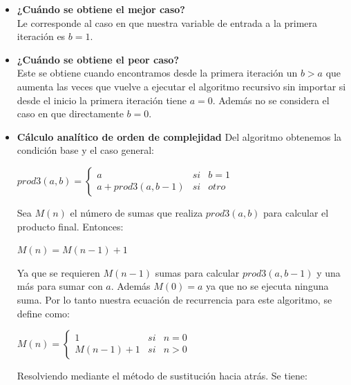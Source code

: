 \documentclass{report}
\begin{document}
            \begin{itemize}
                \item\textbf{¿Cu\'ando se obtiene el mejor caso?}\\
                Le corresponde al caso en que nuestra variable de entrada a la primera iteraci\'on es $b=1$.
                \item\textbf{¿Cu\'ando se obtiene el peor caso?}\\
                Este se obtiene cuando encontramos desde la primera iteraci\'on un $b>a$ que aumenta las veces que vuelve a ejecutar el algoritmo recursivo sin importar si desde el inicio la primera iteraci\'on tiene  $a=0$. Adem\'as no se considera el caso en que directamente $b=0$.
                \item\textbf{C\'alculo anal\'itico de orden de complejidad}
                Del algoritmo obtenemos la condición base y el caso general:
                \begin{center}
                    $prod3(a,b) = 
                    \left\{
                        \begin{array}{lcc}
                            a & si & b=1\\
                            a+prod3(a,b-1) & si & otro
                        \end{array}
                    \right.$
                \end{center}
                Sea $M(n)$ el n\'umero de sumas que realiza $prod3(a,b)$ para calcular el producto final. Entonces:
                \begin{center}
                    $M(n)=M(n-1)+1$
                \end{center}
                Ya que se requieren $M(n-1)$ sumas para calcular $prod3(a,b-1)$ y una más para sumar con $a$. Adem\'as $M(0)=a$ ya que no se ejecuta ninguna suma. Por lo tanto nuestra ecuaci\'on de recurrencia para este algoritmo, se define como:
                \begin{center}
                    $M(n) = 
                    \left\{
                        \begin{array}{lcc}
                            1 & si & n=0\\
                            M(n-1)+1 & si & n>0
                        \end{array}
                    \right.$
                \end{center}
                Resolviendo mediante el m\'etodo de sustituci\'on hacia atr\'as. Se tiene:

\end{itemize}
\end{document}
